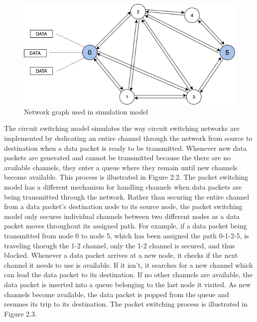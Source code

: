 \documentclass{article}
\begin{document}
  \begin{figure}[h]
  \centering
          \includegraphics[totalheight=6cm]{images/network_graph.png}
  \renewcommand\figurename{Figure}
      \caption{Network graph used in simulation model}
      \label{fig:networkgraph}
  \end{figure}

  The circuit switching model simulates the way circuit switching networks are implemented by dedicating an entire channel
  through the network from source to destination when a data packet is ready to be transmitted. Whenever new data packets are generated and cannot be transmitted
  because the there are no available channels, they enter a queue where they remain until new channels become available. This
  process is illustrated in Figure 2.2. The packet switching model has a different mechanism for handling channels when data packets
  are being transmitted through the network. Rather than securing the entire channel from a data packet's destination node to its
  source node, the packet switching model only secures individual channels between two different nodes as a data packet moves throughout its
  assigned path. For example, if a data packet being transmitted from node 0 to node 5, which has been assigned the path 0-1-2-5, is
  traveling thorugh the 1-2 channel, only the 1-2 channel is secured, and thus blocked. Whenever a data packet arrives at a new node,
  it checks if the next channel it needs to use is available. If it isn't, it searches for a new channel which can lead the data packet
  to its destination. If no other channels are available, the data packet is inserted into a queue belonging to the last node it
  visited. As new channels become available, the data packet is popped from the queue and resumes its trip to its destination. The
  packet switching process is illustrated in Figure 2.3.
\end{document}
